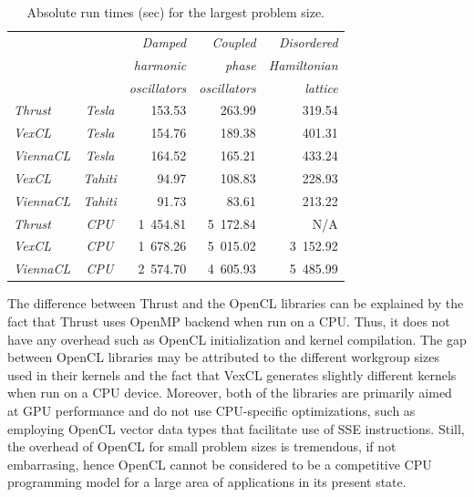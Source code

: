 \documentclass[final]{siamltex}
\begin{document}
\begin{table}
 \centering
    \caption{Absolute run times (sec) for the largest problem size.}
    \label{tab:abstimes}
    \begin{tabular}{|lc|rrr|}
        \hline
        & & \em Damped      & \em Coupled       & \em Disordered  \\ %
        & & \em harmonic    & \em phase         & \em Hamiltonian \\ %
        & & \em oscillators & \em oscillators   & \em lattice     \\ %
        \hline
        \em Thrust   &\em Tesla & 153.53 & 263.99 & 319.54 \\ %
        \em VexCL    &\em Tesla & 154.76 & 189.38 & 401.31 \\ %
        \em ViennaCL &\em Tesla & 164.52 & 165.21 & 433.24 \\ %
        \hline
        \em VexCL    &\em Tahiti &  94.97 & 108.83 & 228.93 \\ %
        \em ViennaCL &\em Tahiti &  91.73 &  83.61 & 213.22 \\ %
        \hline
        \em Thrust   &\em CPU   & 1~454.81 & 5~172.84 &      N/A \\ %
        \em VexCL    &\em CPU   & 1~678.26 & 5~015.02 & 3~152.92 \\ %
        \em ViennaCL &\em CPU   & 2~574.70 & 4~605.93 & 5~485.99 \\ %
        \hline
    \end{tabular}
\end{table}


The difference between Thrust and the OpenCL libraries can be explained by the fact
that Thrust uses OpenMP backend when run on a CPU. Thus, it does not have any
overhead such as OpenCL initialization and kernel compilation.  The gap
between OpenCL libraries may be attributed to the different workgroup sizes
used in their kernels and the fact that VexCL generates slightly different
kernels when run on a CPU device. Moreover, both of the libraries are primarily
aimed at GPU performance and do not use CPU-specific optimizations, such as
employing OpenCL vector data types that facilitate use of SSE instructions.
Still, the overhead of OpenCL for small problem sizes is tremendous, if not embarrasing,
hence OpenCL cannot be considered to be a competitive CPU programming model for a large area of applications in its present state. %
\end{document}
